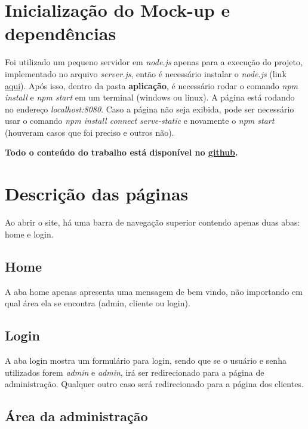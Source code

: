 \documentclass[10pt,a4paper]{article}
\begin{document}
\section{Inicialização do Mock-up e dependências}
Foi utilizado um pequeno servidor em \textit{node.js} apenas para a execução do projeto, implementado no arquivo \textit{server.js}, então é necessário instalar o \textit{node.js} (link \href{https://nodejs.org/en/}{aqui}). Após isso, dentro da pasta \textbf{aplicação}, é necessário rodar o comando \textit{npm install} e \textit{npm start} em um terminal (windows ou linux). A página está rodando no endereço \textit{localhost:8080}. Caso a página não seja exibida, pode ser necessário usar o comando \textit{npm install connect serve-static} e novamente o \textit{npm start} (houveram casos que foi preciso e outros não).

\textbf{Todo o conteúdo do trabalho está disponível no \href{https://github.com/Adams123/Web2017}{github}.}

\section{Descrição das páginas}
Ao abrir o site, há uma barra de navegação superior contendo apenas duas abas: home e login.
\subsection{Home}
A aba home apenas apresenta uma mensagem de bem vindo, não importando em qual área ela se encontra (admin, cliente ou login).
\subsection{Login}
A aba login mostra um formulário para login, sendo que se o usuário e senha utilizados forem \textit{admin} e \textit{admin}, irá ser redirecionado para a página de administração. Qualquer outro caso será redirecionado para a página dos clientes.
\subsection{Área da administração}
\end{document}
